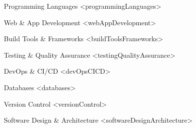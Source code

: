 

\begin{cvskills}
    
    
    \cvskill
    {Programming Languages}
    {<programmingLanguages>}
    
    
    \cvskill
    {Web \& App Development}
    {<webAppDevelopment>}
    
    
    \cvskill
    {Build Tools \& Frameworks}
    {<buildToolsFrameworks>}
    
    
    \cvskill
    {Testing \& Quality Assurance}
    {<testingQualityAssurance>}
    
    
    \cvskill
    {DevOps \& CI/CD}
    {<devOpsCICD>}
    
    
    \cvskill
    {Databases}
    {<databases>}
    
    
    \cvskill
    {Version Control}
    {<versionControl>}
    
    
    \cvskill
    {Software Design \& Architecture}
    {<softwareDesignArchitecture>}
    
\end{cvskills}
